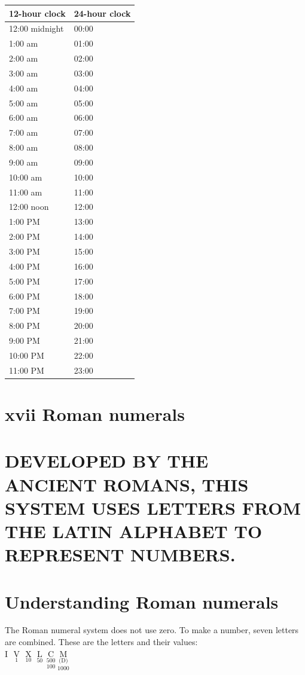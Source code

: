 \documentclass[10pt]{article}
\begin{document}
\begin{center}
\begin{tabular}{|l|l|}
\hline
12-hour clock & 24-hour clock \\
\hline
12:00 midnight & 00:00 \\
\hline
1:00 am & 01:00 \\
\hline
2:00 am & 02:00 \\
\hline
3:00 am & 03:00 \\
\hline
4:00 am & 04:00 \\
\hline
5:00 am & 05:00 \\
\hline
6:00 am & 06:00 \\
\hline
7:00 am & 07:00 \\
\hline
8:00 am & 08:00 \\
\hline
9:00 am & 09:00 \\
\hline
10:00 am & 10:00 \\
\hline
11:00 am & 11:00 \\
\hline
12:00 noon & 12:00 \\
\hline
1:00 PM & 13:00 \\
\hline
2:00 PM & 14:00 \\
\hline
3:00 PM & 15:00 \\
\hline
4:00 PM & 16:00 \\
\hline
5:00 PM & 17:00 \\
\hline
6:00 PM & 18:00 \\
\hline
7:00 PM & 19:00 \\
\hline
8:00 PM & 20:00 \\
\hline
9:00 PM & 21:00 \\
\hline
10:00 PM & 22:00 \\
\hline
11:00 PM & 23:00 \\
\hline
\end{tabular}
\end{center}

\section*{xvii Roman numerals}
\section*{DEVELOPED BY THE ANCIENT ROMANS, THIS SYSTEM USES LETTERS FROM THE LATIN ALPHABET TO REPRESENT NUMBERS.}
\section*{Understanding Roman numerals}
The Roman numeral system does not use zero. To make a number, seven letters are combined. These are the letters and their values:\\
I $\underset{1}{\text { V }} \underset{10}{\text { X }} \underset{50}{\text { L }} \underset{100}{\underset{500}{\text { C }}} \underset{1000}{\underset{\text { (D) }}{\text { M }}}$
\end{document}
